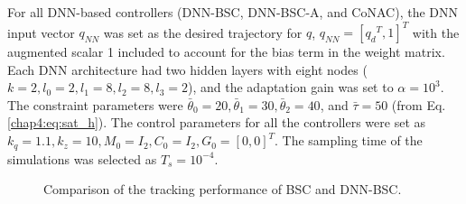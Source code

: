 For all DNN-based controllers (DNN-BSC, DNN-BSC-A, and CoNAC), the DNN input vector $q_{NN}$ was set as the desired trajectory for ${q}$, \ie $q_{NN}=[{q_d}^T,1]^T$ with the augmented scalar 1 included to account for the bias term in the weight matrix. 
Each DNN architecture had two hidden layers with eight nodes (\ie $k=2, l_0=2, l_1=8, l_2=8, l_3=2$), and the adaptation gain was set to $\alpha =10^3$. The constraint parameters were $\bar\theta_0=20, \bar\theta_1=30, \bar\theta_2=40$, and $\bar\tau = 50$ (from Eq. \eqref{chap4:eq:sat_h}). The control parameters for all the controllers were set as ${k_q}=1.1,{k_z}=10,M_0=I_2,C_0=I_2,G_0=[0,0]^T$.
The sampling time of the simulations was selected as $T_s=10^{-4}$.


\begin{figure}[!t]
    \centering
    \vfill
    \caption{Comparison of the tracking performance of BSC and DNN-BSC.}
    \label{chap4:fig:tracking1}
\end{figure}

